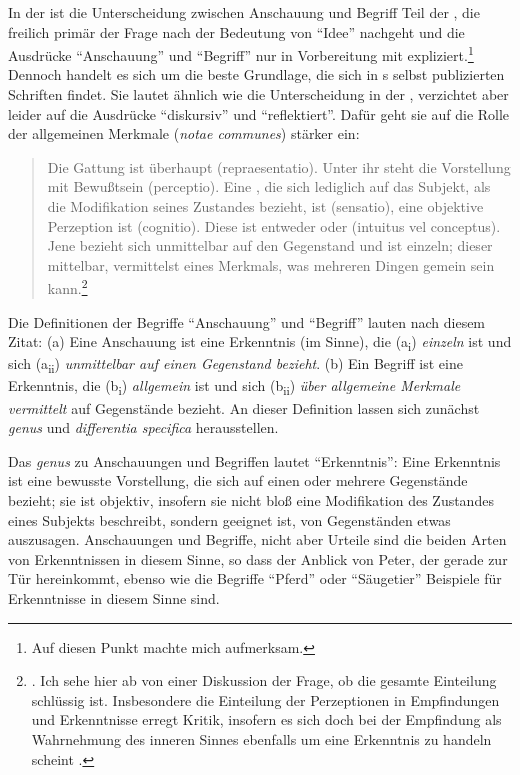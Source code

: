 In der  ist die Unterscheidung zwischen
Anschauung und Begriff Teil der , die freilich
primär der Frage nach der Bedeutung von \enquote{Idee} nachgeht und die
Ausdrücke \enquote{Anschauung} und \enquote{Begriff} nur in Vorbereitung mit
expliziert.\footnote{Auf diesen Punkt machte mich
 aufmerksam.} Dennoch handelt
es sich um die beste Grundlage, die sich in s selbst
publizierten Schriften findet. Sie lautet ähnlich wie die Unterscheidung in der
{\jaeschelogik}, verzichtet aber leider auf die Ausdrücke \enquote{diskursiv} und
\enquote{reflektiert}. Dafür geht sie auf die Rolle der allgemeinen Merkmale
(\emph{notae communes}) stärker ein:
\begin{quote}
Die Gattung ist  überhaupt (repraesentatio). Unter ihr steht
die Vorstellung mit Bewußtsein (perceptio). Eine , die sich
lediglich auf das Subjekt, als die Modifikation seines Zustandes bezieht, ist
 (sensatio), eine objektive Perzeption ist 
(cognitio). Diese ist entweder  oder  (intuitus
vel conceptus). Jene bezieht sich unmittelbar auf den Gegenstand und ist
einzeln; dieser mittelbar, vermittelst eines Merkmals, was mehreren Dingen
gemein sein kann.\footnote{\cite[][B
376\,f.,]{Kant:KritikderreinenVernunft2003} \cite[][III:
249.37--250.7]{Kant:GesammelteWerke1900ff.}. Ich sehe hier ab von einer
Diskussion der Frage, ob die gesamte Einteilung schlüssig ist.
Insbesondere die Einteilung der Perzeptionen in Empfindungen und Erkenntnisse
erregt Kritik, insofern es sich doch bei der Empfindung als Wahrnehmung des
inneren Sinnes ebenfalls um eine Erkenntnis zu handeln scheint
\parencite[vgl.][79--81]{Heidemann:AnschauungundBegriff2002}.}
\end{quote}
Die Definitionen der Begriffe \enquote{Anschauung} und \enquote{Begriff} lauten
nach diesem Zitat: (a) Eine Anschauung ist eine Erkenntnis (im
 Sinne), die (a\textsubscript{i}) \emph{einzeln} ist
und sich (a\textsubscript{ii}) \emph{unmittelbar auf einen Gegenstand bezieht}.
(b) Ein Begriff ist eine  Erkenntnis, die
(b\textsubscript{i}) \emph{allgemein} ist und sich (b\textsubscript{ii})
\emph{über allgemeine Merkmale vermittelt} auf Gegenstände bezieht. An dieser
Definition lassen sich zunächst \emph{genus} und \emph{differentia specifica}
herausstellen.

Das \emph{genus} zu Anschauungen und Begriffen lautet \enquote{Erkenntnis}: Eine
Erkenntnis ist eine bewusste Vorstellung, die sich auf einen oder mehrere Gegenstände bezieht; sie ist
objektiv, insofern sie nicht bloß eine Modifikation des Zustandes eines Subjekts
beschreibt, sondern geeignet ist, von Gegenständen etwas auszusagen.
Anschauungen und Begriffe, nicht aber Urteile sind die beiden Arten von
Erkenntnissen in diesem Sinne, so dass der Anblick von Peter, der gerade zur Tür
hereinkommt, ebenso wie die Begriffe \enquote{Pferd} oder \enquote{Säugetier}
Beispiele für Erkenntnisse in diesem Sinne sind.

